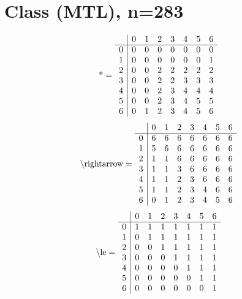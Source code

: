 \documentclass[11pt]{article}
\begin{document}
\section{Class (MTL), n=283}
\[\text{*} = 
\begin{array}{r | r r r r r r r}
 & 0 & 1 & 2 & 3 & 4 & 5 & 6 \\ \hline
0 & 0 & 0 & 0 & 0 & 0 & 0 & 0 \\
1 & 0 & 0 & 0 & 0 & 0 & 0 & 1 \\
2 & 0 & 0 & 2 & 2 & 2 & 2 & 2 \\
3 & 0 & 0 & 2 & 2 & 3 & 3 & 3 \\
4 & 0 & 0 & 2 & 3 & 4 & 4 & 4 \\
5 & 0 & 0 & 2 & 3 & 4 & 5 & 5 \\
6 & 0 & 1 & 2 & 3 & 4 & 5 & 6 \\
\end{array}
\]
\[\text{\textbackslash rightarrow} = 
\begin{array}{r | r r r r r r r}
 & 0 & 1 & 2 & 3 & 4 & 5 & 6 \\ \hline
0 & 6 & 6 & 6 & 6 & 6 & 6 & 6 \\
1 & 5 & 6 & 6 & 6 & 6 & 6 & 6 \\
2 & 1 & 1 & 6 & 6 & 6 & 6 & 6 \\
3 & 1 & 1 & 3 & 6 & 6 & 6 & 6 \\
4 & 1 & 1 & 2 & 3 & 6 & 6 & 6 \\
5 & 1 & 1 & 2 & 3 & 4 & 6 & 6 \\
6 & 0 & 1 & 2 & 3 & 4 & 5 & 6 \\
\end{array}
\]
\[\text{\textbackslash le} = 
\begin{array}{r | r r r r r r r}
 & 0 & 1 & 2 & 3 & 4 & 5 & 6 \\ \hline
0 & 1 & 1 & 1 & 1 & 1 & 1 & 1 \\
1 & 0 & 1 & 1 & 1 & 1 & 1 & 1 \\
2 & 0 & 0 & 1 & 1 & 1 & 1 & 1 \\
3 & 0 & 0 & 0 & 1 & 1 & 1 & 1 \\
4 & 0 & 0 & 0 & 0 & 1 & 1 & 1 \\
5 & 0 & 0 & 0 & 0 & 0 & 1 & 1 \\
6 & 0 & 0 & 0 & 0 & 0 & 0 & 1 \\
\end{array}
\]
\end{document}
